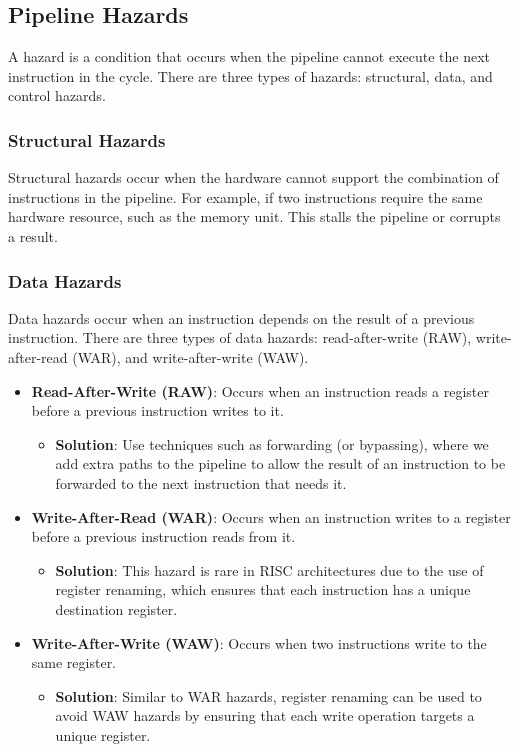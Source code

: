 \subsection {Pipeline Hazards}
A hazard is a condition that occurs when the pipeline cannot execute the next instruction in the cycle. There are three types of hazards: structural, data, and control hazards.\cite{olanrewaju2017design}
\subsubsection {Structural Hazards}
Structural hazards occur when the hardware cannot support the combination of instructions in the pipeline. For example, if two instructions require the same hardware resource, such as the memory unit\cite{pandey2016study}.
This stalls the pipeline or corrupts a result.\cite{proebsting1994detecting}
\subsubsection {Data Hazards}
Data hazards occur when an instruction depends on the result of a previous instruction. There are three types of data hazards: read-after-write (RAW), write-after-read (WAR), and write-after-write (WAW). 

\begin{itemize}
    \item \textbf{Read-After-Write (RAW)}: Occurs when an instruction reads a register before a previous instruction writes to it. 
    \begin{itemize}
        \item \textbf{Solution}: Use techniques such as forwarding (or bypassing), where we add extra paths to the pipeline to allow the result of an instruction to be forwarded to the next instruction that needs it.
    \end{itemize}
    \item \textbf{Write-After-Read (WAR)}: Occurs when an instruction writes to a register before a previous instruction reads from it.
    \begin{itemize}
        \item \textbf{Solution}: This hazard is rare in RISC architectures due to the use of register renaming, which ensures that each instruction has a unique destination register.
    \end{itemize}
    \item \textbf{Write-After-Write (WAW)}: Occurs when two instructions write to the same register.
    \begin{itemize}
        \item \textbf{Solution}: Similar to WAR hazards, register renaming can be used to avoid WAW hazards by ensuring that each write operation targets a unique register.
    \end{itemize}
\end{itemize}\cite{pandey2016study}

